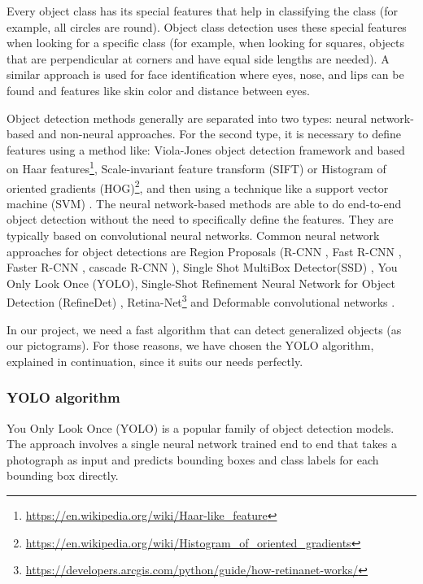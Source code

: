 Every object class has its special features that help in classifying the class (for example, all circles are round). Object class detection uses these special features when looking for a specific class (for example, when looking for squares, objects that are perpendicular at corners and have equal side lengths are needed). A similar approach is used for face identification where eyes, nose, and lips can be found and features like skin color and distance between eyes.

Object detection methods generally are separated into two types: neural network-based and non-neural approaches. For the second type, it is necessary to define features using a method like: Viola-Jones object detection framework \citep{Viola01robustreal-time} and \citep{Viola01rapidobject} based on Haar features\footnote{\href{https://en.wikipedia.org/wiki/Haar-like_feature}{https://en.wikipedia.org/wiki/Haar-like\_feature}}, Scale-invariant feature transform (SIFT) \citep{local_scale-invariant} or Histogram of oriented gradients (HOG)\footnote{\href{https://en.wikipedia.org/wiki/Histogram_of_oriented_gradients}{https://en.wikipedia.org/wiki/Histogram\_of\_oriented\_gradients}}, and then using a technique like a support vector machine (SVM) \citep{svm}. The neural network-based methods are able to do end-to-end object detection without the need to specifically define the features. They are typically based on convolutional neural networks. Common neural network approaches for object detections are Region Proposals (R-CNN \citep{rcnn}, Fast R-CNN \citep{fast_rcnn}, Faster R-CNN \citep{faster_rcnn}, cascade R-CNN \citep{cascade_rcnn}), Single Shot MultiBox Detector(SSD) \citep{ssd}, You Only Look Once (YOLO), Single-Shot Refinement Neural Network for Object Detection (RefineDet) \citep{RefineDet}, Retina-Net\footnote{\href{https://developers.arcgis.com/python/guide/how-retinanet-works/}{https://developers.arcgis.com/python/guide/how-retinanet-works/}} and Deformable convolutional networks \citep{dcnn}.

In our project, we need a fast algorithm that can detect generalized objects (as our pictograms). For those reasons, we have chosen the YOLO algorithm, explained in continuation, since it suits our needs perfectly.

\subsubsection{YOLO algorithm}
\label{yolo}

You Only Look Once (YOLO) \citep{yolo} is a popular family of object detection models. The approach involves a single neural network trained end to end that takes a photograph as input and predicts bounding boxes and class labels for each bounding box directly.

